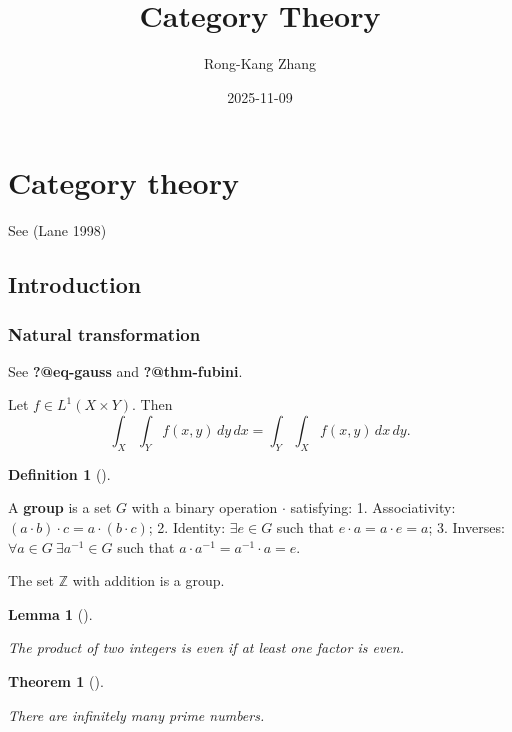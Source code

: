 \documentclass[
  letterpaper,
  DIV=11,
  numbers=noendperiod]{scrartcl}
\title{Category Theory}
\author{Rong-Kang Zhang}
\date{2025-11-09}
\renewcommand*\contentsname{Table of contents}
\newcommand\contentsname{Table of contents}
\theoremstyle{plain}
\newtheorem{lemma}{Lemma}[section]
\theoremstyle{definition}
\newtheorem{definition}{Definition}[section]
\theoremstyle{plain}
\newtheorem{theorem}{Theorem}[section]
\theoremstyle{plain}
\theoremstyle{remark}
\begin{document}
\maketitle

\renewcommand*\contentsname{Contents}
{
\hypersetup{linkcolor=}
\setcounter{tocdepth}{6}
\tableofcontents
}

\section{Category theory}\label{category-theory}

See (Lane 1998)

\subsection{Introduction}\label{introduction}

\subsubsection{Natural transformation}\label{natural-transformation}

See \textbf{?@eq-gauss} and \textbf{?@thm-fubini}.

\label{fubini}
Let \(f \in L^1(X\times Y)\). Then
\[ \int_X\!\int_Y f(x,y)\,dy\,dx = \int_Y\!\int_X f(x,y)\,dx\,dy. \]

\begin{definition}[]\protect\hypertarget{def-group}{}\label{def-group}

A \textbf{group} is a set \(G\) with a binary operation \(\cdot\)
satisfying: 1. Associativity: \((a\cdot b)\cdot c=a\cdot(b\cdot c)\); 2.
Identity: \(\exists e\in G\) such that \(e\cdot a=a\cdot e=a\); 3.
Inverses: \(\forall a\in G\ \exists a^{-1}\in G\) such that
\(a\cdot a^{-1}=a^{-1}\cdot a=e\).

\end{definition}

\label{ex-integers}
The set \(\mathbb Z\) with addition is a group.

\begin{lemma}[]\protect\hypertarget{lem-product}{}\label{lem-product}

The product of two integers is even if at least one factor is even.

\end{lemma}

\begin{theorem}[]\protect\hypertarget{thm-primes}{}\label{thm-primes}

There are infinitely many prime numbers.

\end{theorem}
\end{document}
